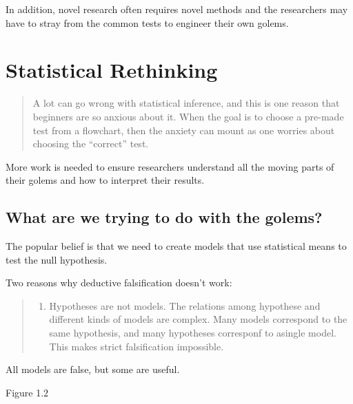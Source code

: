 \documentclass[
]{book}
\providecommand{\tightlist}{%
  \setlength{\itemsep}{0pt}\setlength{\parskip}{0pt}}
\theoremstyle{definition}
\theoremstyle{definition}
\theoremstyle{definition}
\theoremstyle{definition}
\theoremstyle{remark}
\begin{document}
In addition, novel research often requires novel methods and the researchers may have to stray from the common tests to engineer their own golems.

\hypertarget{statistical-rethinking}{%
\section{Statistical Rethinking}\label{statistical-rethinking}}

\begin{quote}
A lot can go wrong with statistical inference, and this is one reason that beginners are
so anxious about it. When the goal is to choose a pre-made test from a flowchart, then the
anxiety can mount as one worries about choosing the ``correct'' test.
\end{quote}

More work is needed to ensure researchers understand all the moving parts of their golems and how to interpret their results.

\hypertarget{what-are-we-trying-to-do-with-the-golems}{%
\subsection{What are we trying to do with the golems?}\label{what-are-we-trying-to-do-with-the-golems}}

The popular belief is that we need to create models that use statistical means to test the null hypothesis.

Two reasons why deductive falsification doesn't work:

\begin{quote}
\begin{enumerate}
\def\labelenumi{\arabic{enumi}.}
\tightlist
\item
  Hypotheses are not models. The relations among hypothese and different kinds of models are complex. Many models correspond to the same hypothesis, and many hypotheses corresponf to asingle model. This makes strict falsification impossible.
\end{enumerate}
\end{quote}

All models are false, but some are useful.

Figure 1.2
\end{document}
